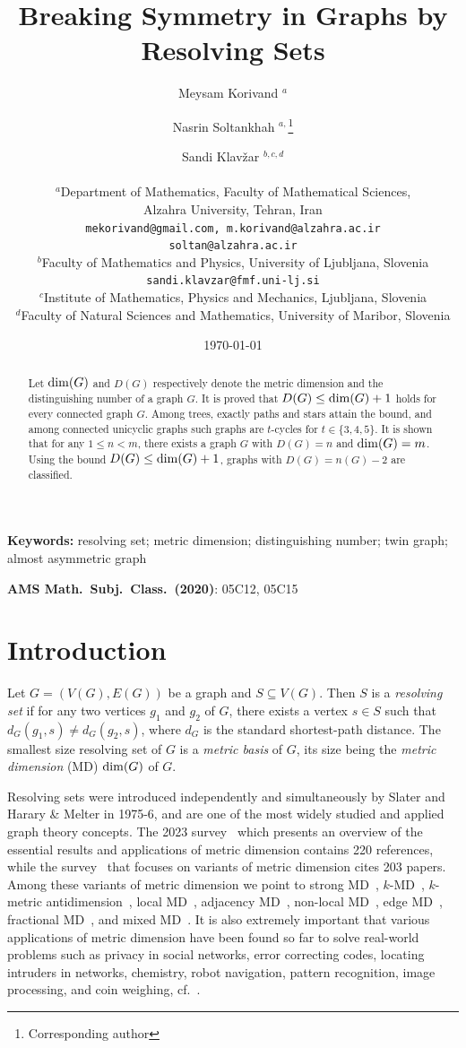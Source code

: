 \documentclass[12pt]{article}
\title{Breaking Symmetry in Graphs by Resolving Sets}
\author{Meysam Korivand $^{a}$ \and Nasrin Soltankhah $^{a,}$\thanks{Corresponding author} \and Sandi Klav\v{z}ar $^{b,c,d}$ \\\\
$^{a}$\small Department of Mathematics, Faculty of Mathematical Sciences, \\
\small Alzahra University, Tehran, Iran \\
\small {\tt mekorivand@gmail.com, m.korivand@alzahra.ac.ir} \\
\small {\tt  soltan@alzahra.ac.ir} \\
$^{b}$\small Faculty of Mathematics and Physics, University of Ljubljana, Slovenia\\
\small {\tt sandi.klavzar@fmf.uni-lj.si} \\
$^{c}$\small Institute of Mathematics, Physics and Mechanics, Ljubljana, Slovenia \\
$^{d}$\small Faculty of Natural Sciences and Mathematics, University of Maribor, Slovenia \\
}
\date{\today}
\begin{document}
\maketitle

\begin{abstract} 
Let ${\rm dim}(G)$ and $D(G)$ respectively denote the metric dimension and the distinguishing number of a graph $G$. It is proved that $D(G) \le {\rm dim}(G)+1$ holds for every connected graph $G$. Among trees, exactly paths and stars attain the bound, and among connected unicyclic graphs such graphs are $t$-cycles for $t\in \{3,4,5\}$. It is shown that for any $1\leq n< m$, there exists a graph $G$ with $D(G)=n$ and ${\rm dim}(G)=m$. Using the bound $D(G) \le {\rm dim}(G)+1$, graphs with $D(G) = n(G)-2$ are classified. 
\end{abstract}

\noindent
\textbf{Keywords:} resolving set; metric dimension; distinguishing number; twin graph; almost asymmetric graph

\medskip\noindent
\textbf{AMS Math.\ Subj.\ Class.\ (2020)}: 05C12, 05C15

\section{Introduction} 
\label{sec:intro}

Let $G = (V(G), E(G))$ be a graph and $S \subseteq V(G)$. Then $S$ is a {\it resolving set} if for any two vertices $g_1$  and $g_2$ of $G$, there exists a vertex $s \in S$ such that $d_G(g_1, s)\neq d_G(g_2, s)$, where $d_G$ is the standard shortest-path distance. The smallest size resolving set of $G$ is a {\em metric basis} of $G$, its size being the {\it metric dimension} (MD) ${\rm dim}(G)$ of $G$. 

Resolving sets were introduced independently and simultaneously by Slater \cite{slater} and Harary \& Melter \cite{harary} in 1975-6, and are one of the most widely studied and applied graph theory concepts. The 2023 survey~\cite{survey2} which presents an overview of the essential results
and applications of metric dimension contains 220 references, while the survey~\cite{survey1} that focuses on variants of metric dimension cites 203 papers. Among these variants of metric dimension we point to strong MD~\cite{b.1}, $k$-MD~\cite{c.4}, $k$-metric antidimension~\cite{2a}, local MD~\cite{b.2}, adjacency MD~\cite{c.5}, non-local MD~\cite{Klavzar0}, edge MD~\cite{c.7}, fractional MD~\cite{c.9}, and mixed MD~\cite{c.8}. It is also extremely important that various applications of metric dimension have been found so far to solve real-world problems such as privacy in social networks, error correcting codes, locating intruders in networks, chemistry, robot navigation, pattern recognition, image processing, and coin weighing, cf.~\cite{survey2}.
\end{document}
